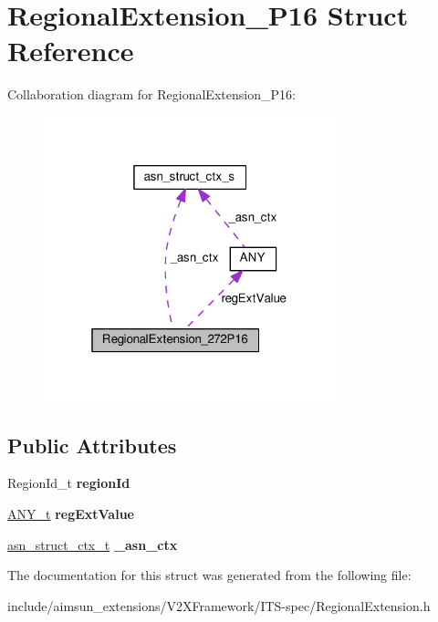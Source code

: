 \hypertarget{structRegionalExtension__272P16}{}\section{Regional\+Extension\+\_\+P16 Struct Reference}
\label{structRegionalExtension__272P16}


Collaboration diagram for Regional\+Extension\+\_\+P16\+:\nopagebreak
\begin{figure}[H]
\begin{center}
\leavevmode
\includegraphics[width=241pt]{structRegionalExtension__272P16__coll__graph}
\end{center}
\end{figure}
\subsection*{Public Attributes}
\begin{DoxyCompactItemize}
\item 
Region\+Id\+\_\+t {\bfseries region\+Id}\hypertarget{structRegionalExtension__272P16_af666d1fcd7557c532bc608a1b9e349ad}{}\label{structRegionalExtension__272P16_af666d1fcd7557c532bc608a1b9e349ad}

\item 
\hyperlink{structANY}{A\+N\+Y\+\_\+t} {\bfseries reg\+Ext\+Value}\hypertarget{structRegionalExtension__272P16_aea82836b262393ab387a541bb964d5ae}{}\label{structRegionalExtension__272P16_aea82836b262393ab387a541bb964d5ae}

\item 
\hyperlink{structasn__struct__ctx__s}{asn\+\_\+struct\+\_\+ctx\+\_\+t} {\bfseries \+\_\+asn\+\_\+ctx}\hypertarget{structRegionalExtension__272P16_a9cf1fac6430daa631df23f86dadb27e5}{}\label{structRegionalExtension__272P16_a9cf1fac6430daa631df23f86dadb27e5}

\end{DoxyCompactItemize}


The documentation for this struct was generated from the following file\+:\begin{DoxyCompactItemize}
\item 
include/aimsun\+\_\+extensions/\+V2\+X\+Framework/\+I\+T\+S-\/spec/Regional\+Extension.\+h\end{DoxyCompactItemize}
